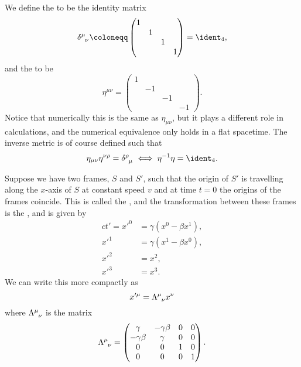 We define the  to be the identity matrix
\begin{equation}
    \tensor{\delta}{^\mu_\nu} \coloneqq 
    \begin{pmatrix}
        1 & & & \\
        & 1 & & \\
        & & 1 & \\
        & & & 1
    \end{pmatrix}
    = \ident_4,
\end{equation}
and the  to be
\begin{equation}
    \eta^{\mu\nu} = 
    \begin{pmatrix}
        1 & & & \\
        & -1 & & \\
        & & -1 & \\
        & & & -1
    \end{pmatrix}
    .
\end{equation}
Notice that numerically this is the same as \(\eta_{\mu\nu}\), but it plays a different role in calculations, and the numerical equivalence only holds in a flat spacetime.
The inverse metric is of course defined such that
\begin{equation}
    \eta_{\mu\nu}\eta^{\nu\rho} = \tensor{\delta}{^\rho_\mu} \iff \eta^{-1}\eta = \ident_4.
\end{equation}

Suppose we have two frames, \(S\) and \(S'\), such that the origin of \(S'\) is travelling along the \(x\)-axis of \(S\) at constant speed \(v\) and at time \(t = 0\) the origins of the frames coincide.
This is called the , and the transformation between these frames is the , and is given by
\begin{align}
    ct' = x'^0 &= \gamma(x^0 - \beta x^1),\\
    x'^1 &= \gamma(x^1 - \beta x^0),\\
    x'^2 &= x^2,\\
    x'^3 &= x^3.
\end{align}
We can write this more compactly as
\begin{equation}
    x'^\mu = \tensor{\Lambda}{^\mu_\nu}x^\nu
\end{equation}
where \(\tensor{\Lambda}{^\mu_\nu}\) is the matrix
\begin{equation}
    \tensor{\Lambda}{^\mu_\nu} =
    \begin{pmatrix}
        \gamma & -\gamma\beta & 0 & 0\\
        -\gamma\beta & \gamma & 0 & 0\\
        0 & 0 & 1 & 0\\
        0 & 0 & 0 & 1
    \end{pmatrix}
    .
\end{equation}

